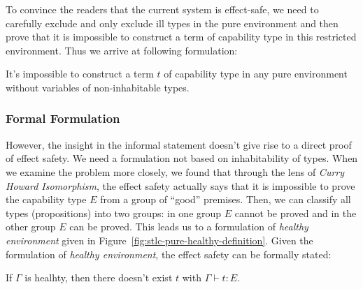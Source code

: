To convince the readers that the current system is effect-safe, we
need to carefully exclude and only exclude ill types in the pure
environment and then prove that it is impossible to construct a term
of capability type in this restricted environment. Thus we arrive at
following formulation:

\begin{definition}
  It's impossible to construct a term $t$ of capability type in any
  pure environment without variables of non-inhabitable types.
\end{definition}

\subsubsection{Formal Formulation}

However, the insight in the informal statement doesn't give rise to a
direct proof of effect safety. We need a formulation not based on
inhabitability of types. When we examine the problem more closely, we
found that through the lens of \emph{Curry Howard Isomorphism}, the
effect safety actually says that it is impossible to prove the
capability type $E$ from a group of ``good'' premises. Then, we can
classify all types (propositions) into two groups: in one group $E$
cannot be proved and in the other group $E$ can be proved. This leads
us to a formulation of \emph{healthy environment} given in
Figure~\ref{fig:stlc-pure-healthy-definition}. Given the formulation
of \emph{healthy environment}, the effect safety can be formally
stated:

\begin{definition}
  If $\Gamma$ is healhty, then there doesn't exist $t$ with
  $\Gamma \vdash t : E$.
\end{definition}

